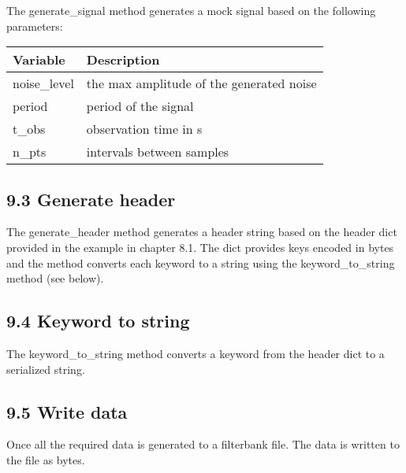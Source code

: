 \documentclass[]{article}
\begin{document}
The generate\_signal method generates a mock signal based on the
following parameters:

\begin{longtable}[]{@{}ll@{}}
\toprule
Variable & Description\tabularnewline
\midrule
\endhead
noise\_level & the max amplitude of the generated noise\tabularnewline
period & period of the signal\tabularnewline
t\_obs & observation time in s\tabularnewline
n\_pts & intervals between samples\tabularnewline
\bottomrule
\end{longtable}

\subsection{9.3 Generate header}\label{generate-header}

The generate\_header method generates a header string based on the
header dict provided in the example in chapter 8.1. The dict provides
keys encoded in bytes and the method converts each keyword to a string
using the keyword\_to\_string method (see below).

\subsection{9.4 Keyword to string}\label{keyword-to-string}

The keyword\_to\_string method converts a keyword from the header dict
to a serialized string.

\subsection{9.5 Write data}\label{write-data}

Once all the required data is generated to a filterbank file. The data
is written to the file as bytes.
\end{document}
